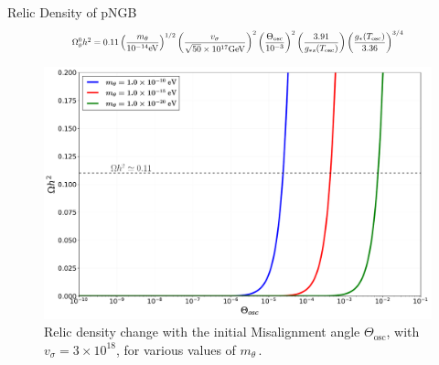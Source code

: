 \begin{frame}{Relic Density of pNGB}
    \[\Scale[0.7]{\Omega^0_\theta h^2=0.11\left(\dfrac{m_\theta}{10^{-14}\si{\eV}}\right)^{1/2}\left(\dfrac{v_\sigma}{\sqrt{50}\times10^{17}\si{G\eV}}\right)^{2}\left(\dfrac{\Theta_\textrm{osc}}{10^{-3}}\right)^{2}\left(\dfrac{3.91}{g_{*s}(T_\textrm{osc})}\right)\left(\dfrac{g_*(T_\textrm{osc})}{3.36}\right)^{3/4}}\]
	\begin{figure}[H]
	\centering
	\includegraphics[width=0.6\linewidth]{Figures/relic_density.pdf}
	\caption{Relic density change with the initial Misalignment angle $\Theta_\textrm{osc}$, with $v_\sigma=3\times 10^{18}$, for various values of $m_\theta$\,.}
	\label{fig:relicdesity}
	\end{figure}
\end{frame}
 

